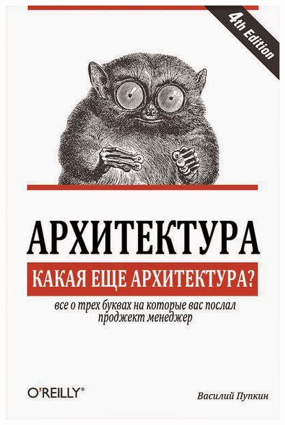\documentclass[xetex,mathserif,serif]{beamer}
\begin{document}
\begin{frame}
\begin{columns}
\begin{column}{0.3\textwidth}
				\includegraphics[width=\textwidth]{whatArchitecture.png}
			\end{column}
		\end{columns}
	\end{frame}
\end{document}
